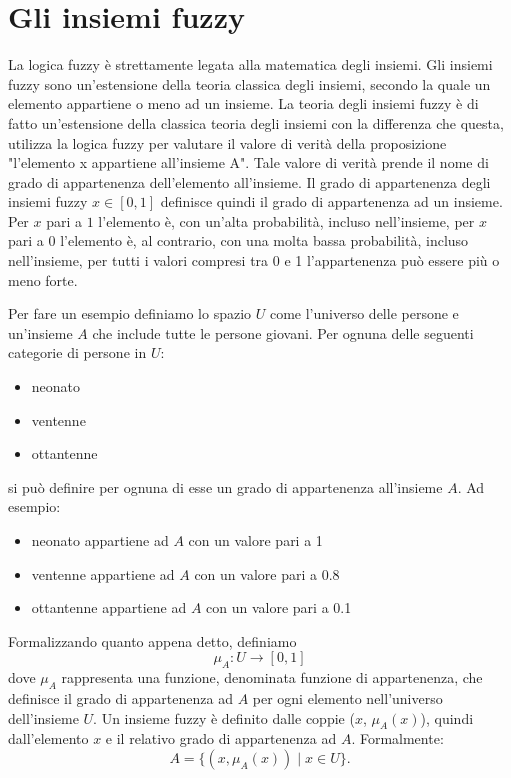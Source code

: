 \documentclass[12pt,italian]{report}
\begin{document}
\section{Gli insiemi fuzzy}
La logica fuzzy è strettamente legata alla matematica degli insiemi. Gli insiemi fuzzy sono un'estensione della teoria classica degli insiemi, secondo la quale un elemento appartiene o meno ad un insieme. %
La teoria degli insiemi fuzzy è di fatto un'estensione della classica teoria degli insiemi con la differenza che questa, utilizza la logica fuzzy per valutare il valore di verità della proposizione "l'elemento x appartiene all'insieme A". Tale valore di verità prende il nome di grado di appartenenza dell'elemento all'insieme.
Il grado di appartenenza degli insiemi fuzzy $x \in [0,1]$ definisce quindi il grado di appartenenza ad un insieme. Per $ x $ pari a $ 1 $ l'elemento è, con un'alta probabilità, incluso nell'insieme, per $ x $ pari a $ 0 $ l'elemento è, al contrario, con una molta bassa probabilità, incluso nell'insieme, per tutti i valori compresi tra 0 e 1 l'appartenenza può essere più o meno forte.

Per fare un esempio definiamo lo spazio $ U $ come l'universo delle persone e un'insieme $ A $ che include tutte le persone giovani.
Per ognuna delle seguenti categorie di persone in $ U $:
\begin{itemize}
	\item neonato
	\item ventenne
	\item ottantenne
\end{itemize}
si può definire per ognuna di esse un grado di appartenenza all'insieme $ A $. Ad esempio:
\begin{itemize}
	\item neonato appartiene ad $ A $ con un valore pari a 1
	\item ventenne appartiene ad $ A $ con un valore pari a 0.8
	\item ottantenne appartiene ad $ A $ con un valore pari a 0.1
\end{itemize}
Formalizzando quanto appena detto, definiamo
\[ \mu_{A}: U \rightarrow [0,1] \]
dove $ \mu_{A} $ rappresenta una funzione, denominata funzione di appartenenza, che definisce il grado di appartenenza ad $ A $ per ogni elemento nell'universo dell'insieme $ U $. Un insieme fuzzy è definito dalle coppie ($x$,  $ \mu_{A}(x)$), quindi dall'elemento $ x $ e il relativo grado di appartenenza ad $ A $. Formalmente:
\[ A = \{  (x, \mu_{A}(x)) \mid x \in U\}. \]
\end{document}
